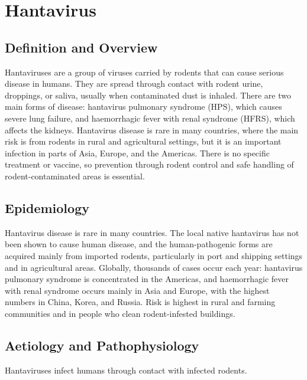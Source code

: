 \chapter{Hantavirus}

\section*{Definition and Overview}
Hantaviruses are a group of viruses carried by rodents that can cause serious disease in humans. They are spread through contact with rodent urine, droppings, or saliva, usually when contaminated dust is inhaled. There are two main forms of disease: hantavirus pulmonary syndrome (HPS), which causes severe lung failure, and haemorrhagic fever with renal syndrome (HFRS), which affects the kidneys. Hantavirus disease is rare in many countries, where the main risk is from rodents in rural and agricultural settings, but it is an important infection in parts of Asia, Europe, and the Americas. There is no specific treatment or vaccine, so prevention through rodent control and safe handling of rodent-contaminated areas is essential.

\section*{Epidemiology}
Hantavirus disease is rare in many countries. The local native hantavirus has not been shown to cause human disease, and the human-pathogenic forms are acquired mainly from imported rodents, particularly in port and shipping settings and in agricultural areas. Globally, thousands of cases occur each year: hantavirus pulmonary syndrome is concentrated in the Americas, and haemorrhagic fever with renal syndrome occurs mainly in Asia and Europe, with the highest numbers in China, Korea, and Russia. Risk is highest in rural and farming communities and in people who clean rodent-infested buildings.

\section*{Aetiology and Pathophysiology}
Hantaviruses infect humans through contact with infected rodents.

